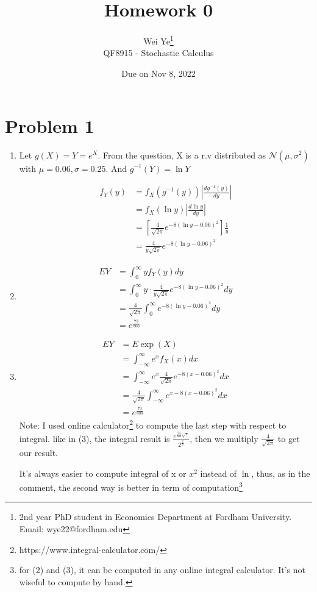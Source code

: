 \documentclass[11pt]{article} %
\title{Homework 0}
\author{Wei Ye\footnote{2nd year PhD student in Economics Department at Fordham University. Email: wye22@fordham.edu}
    \\ QF8915 - Stochastic Calculus}
\date{Due on Nov 8, 2022}
\begin{document}
\maketitle

\section*{Problem 1}
\begin{enumerate}[(1)]
    \item Let $g(X)=Y=e^X$. From the question, X is a r.v distributed as $\mathcal{N}(\mu,\sigma^2)$ with $\mu = 0.06, \sigma = 0.25$.
        And $g^{-1}(Y)= \ln Y$

        \begin{align*}
            f_Y(y)&=f_X(g^{-1}(y))|\frac{dg^{-1}(y)}{dy}|\\
                  &=f_X(\ln y)|\frac{d \ln y}{d y}|\\
                  &=[\frac{4}{\sqrt{2\pi}} e^{-8(\ln y -0.06)^2}]\frac{1}{y}\\
                  &=\frac{4}{y\sqrt{2\pi}}e^{-8(\ln y -0.06)^2}
        \end{align*}
    
    \item \begin{align*}
        EY &= \int_0^\infty yf_Y(y) dy\\
            &= \int_0^\infty y\cdot \frac{4}{y\sqrt{2\pi}}e^{-8(\ln y -0.06)^2} dy\\
            &= \frac{4}{\sqrt{2\pi}} \int_0^\infty e^{-8(\ln y -0.06)^2} dy\\
            &= e^{\frac{73}{800}}
    \end{align*}
    
    \item \begin{align*}
        EY &= E\exp(X)\\
            &= \int_{-\infty}^{\infty} e^x f_X(x) dx\\
            &= \int_{-\infty}^{\infty} e^x \frac{4}{\sqrt{2\pi}} e^{-8(x-0.06)^2} dx\\
            &= \frac{4}{\sqrt{2\pi}} \int_{-\infty}^{\infty} e^{x-8(x-0.06)^2} dx\\
            &= e^{\frac{73}{800}}
    \end{align*}
    Note: I used online calculator\footnote{https://www.integral-calculator.com/} to compute the last step with respect to integral. like in (3), the integral result is $\frac{e^{\frac{73}{800}\sqrt{\pi}}}{2^{\frac{2}{3}}}$, then we multiply $\frac{4}{\sqrt{2\pi}}$ to get our result.

    It's always easier to compute integral of x or $x^2$ instead of $\ln$, thus, as in the comment, the second way is better in term of computation\footnote{for (2) and (3), it can be computed in any online integral calculator. It's not wiseful to compute by hand.} 
\end{enumerate}
\end{document}

